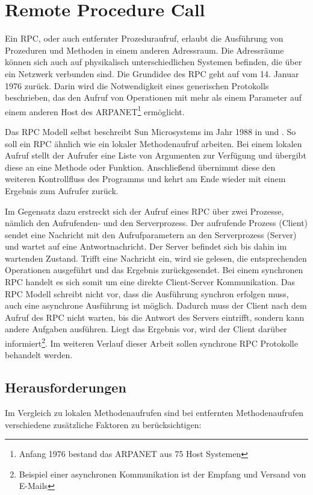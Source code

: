 \section{Remote Procedure Call}\label{sec:rpc}
Ein \ac{RPC}, oder auch entfernter Prozeduraufruf, erlaubt die Ausführung von
Prozeduren und Methoden in einem anderen Adressraum. Die Adressräume können sich
auch auf physikalisch unterschiedlichen Systemen befinden, die über ein Netzwerk
verbunden sind. Die Grundidee des \ac{RPC} geht auf \cite{rfc707} vom 14. Januar
1976 zurück. Darin wird die Notwendigkeit eines generischen Protokolls beschrieben,
das den Aufruf von Operationen mit mehr als einem Parameter auf einem anderen
Host des ARPANET\footnote{Anfang 1976 bestand das ARPANET aus 75 Host
Systemen} ermöglicht.

Das \ac{RPC} Modell selbst beschreibt Sun Microsystems im Jahr 1988 in
\cite{rfc1057} und \cite{rfc1831}. So soll ein \ac{RPC} ähnlich wie ein lokaler
Methodenaufruf arbeiten. Bei einem lokalen Aufruf stellt der Aufrufer eine Liste
von Argumenten zur Verfügung und übergibt diese an eine Methode oder Funktion.
Anschließend übernimmt diese den weiteren Kontrollfluss des Programms und kehrt
am Ende wieder mit einem Ergebnis zum Aufrufer zurück.

Im Gegensatz dazu erstreckt sich der Aufruf eines \ac{RPC} über
zwei Prozesse, nämlich den Aufrufenden- und den Serverprozess. Der aufrufende
Prozess (Client) sendet eine Nachricht mit den Aufrufparametern an den
Serverprozess (Server) und wartet auf eine Antwortnachricht. Der Server befindet
sich bis dahin im wartenden Zustand. Trifft eine Nachricht ein, wird sie gelesen,
die entsprechenden Operationen ausgeführt und das Ergebnis zurückgesendet. Bei
einem synchronen \ac{RPC} handelt es sich somit um eine direkte Client-Server
Kommunikation. Das \ac{RPC} Modell schreibt nicht vor, dass die Ausführung
synchron erfolgen muss, auch eine asynchrone Ausführung ist möglich. Dadurch
muss der Client nach dem Aufruf des \ac{RPC} nicht warten, bis die Antwort des Servers
eintrifft, sondern kann andere Aufgaben ausführen. Liegt das Ergebnis vor, wird
der Client darüber informiert\footnote{Beispiel einer asynchronen
Kommunikation ist der Empfang und Versand von E-Mails}. Im weiteren Verlauf
dieser Arbeit sollen synchrone \ac{RPC} Protokolle behandelt werden.

\subsection{Herausforderungen}
Im Vergleich zu lokalen Methodenaufrufen sind bei entfernten Methodenaufrufen
verschiedene zusätzliche Faktoren zu berücksichtigen:

